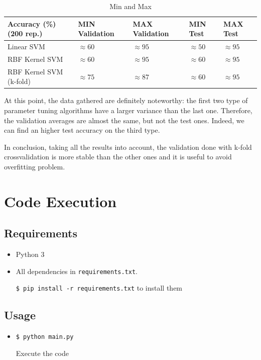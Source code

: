 \documentclass[a4paper, 11pt]{article}
\begin{document}
	\begin{table}[!h]
		\centering
		\caption{Min and Max}
		\label{table2}
		\begin{tabular}{@{}lllll@{}}
			
			\toprule
			\textbf{Accuracy (\%)} (200 rep.)		& MIN Validation	& MAX Validation	& MIN Test		& MAX Test \\ \midrule
			Linear SVM				& $\approx60$	 	&  $\approx95$		& $\approx50$ & $\approx95$ \\
			RBF Kernel SVM			& $\approx60$	 	&  $\approx95$		& $\approx60$ & $\approx95$ \\
			RBF Kernel SVM (k-fold)	& $\approx75$	 	&  $\approx87$		& $\approx60$ & $\approx95$ \\ \bottomrule
		\end{tabular}
	\end{table}

	At this point, the data gathered are definitely noteworthy: the first two type of parameter tuning algorithms have a larger variance than the last one. Therefore, the validation averages are almost the same, but not the test ones. Indeed, we can find an higher test accuracy on the third type.
	
	In conclusion, taking all the results into account, the validation done with k-fold crossvalidation is more stable than the other ones and it is useful to avoid overfitting problem.
		
	\section{Code Execution}
	\subsection{Requirements}
	\begin{itemize}
		\item Python 3
		\item All dependencies in \texttt{requirements.txt}.
		
		\texttt{\$ pip install -r requirements.txt} to install them
	\end{itemize}
	\subsection{Usage}
	\begin{itemize}
		\item \texttt{\$ python main.py}
		
		Execute the code
		
	\end{itemize}
\end{document}
